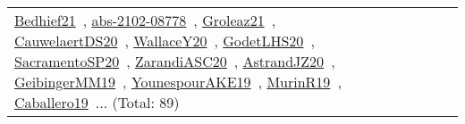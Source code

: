 {\begin{longtable}{lp{3cm}>{\raggedright\arraybackslash}p{6cm}>{\raggedright\arraybackslash}p{6cm}>{\raggedright\arraybackslash}p{8cm}}
\href{works/Bedhief21.pdf}{Bedhief21}~\cite{Bedhief21}, \href{works/abs-2102-08778.pdf}{abs-2102-08778}~\cite{abs-2102-08778}, \href{works/Groleaz21.pdf}{Groleaz21}~\cite{Groleaz21}, \href{works/CauwelaertDS20.pdf}{CauwelaertDS20}~\cite{CauwelaertDS20}, \href{works/WallaceY20.pdf}{WallaceY20}~\cite{WallaceY20}, \href{works/GodetLHS20.pdf}{GodetLHS20}~\cite{GodetLHS20}, \href{works/SacramentoSP20.pdf}{SacramentoSP20}~\cite{SacramentoSP20}, \href{works/ZarandiASC20.pdf}{ZarandiASC20}~\cite{ZarandiASC20}, \href{works/AstrandJZ20.pdf}{AstrandJZ20}~\cite{AstrandJZ20}, \href{works/GeibingerMM19.pdf}{GeibingerMM19}~\cite{GeibingerMM19}, \href{works/YounespourAKE19.pdf}{YounespourAKE19}~\cite{YounespourAKE19}, \href{works/MurinR19.pdf}{MurinR19}~\cite{MurinR19}, \href{works/Caballero19.pdf}{Caballero19}~\cite{Caballero19}... (Total: 89)\\

\end{longtable}}
